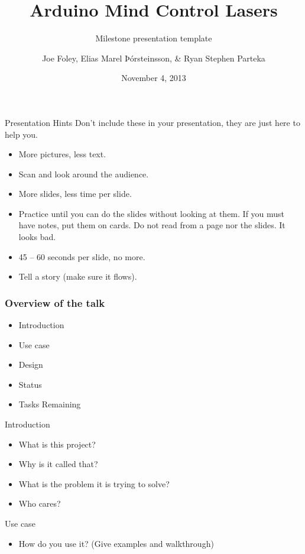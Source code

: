 \documentclass{beamer}
\title{Arduino Mind Control Lasers}
\subtitle{Milestone presentation template}
\author[J. Foley, E. Þorsteinsson, \& R. Parteka]{Joe Foley,
  Elias Marel Þórsteinsson, \& Ryan Stephen Parteka}
\institute[RU]{
  Department of Science and Engineering (TVD) \\
  Reykjavík University \\
}
\date{November 4, 2013} %
\begin{document}
\begin{frame}[plain]
  \titlepage
\end{frame}

\begin{frame}{Presentation Hints}
Don't include these in your presentation, they are just here to help you.
\begin{itemize}
\item More pictures, less text.
\item Scan and look around the audience.
\item More slides, less time per slide.
\item Practice until you can do the slides without looking at them.
  If you must have notes, put them on cards.  Do not read from a page
  nor the slides.  It looks bad.
\item 45 -- 60 seconds per slide, no more.
\item Tell a story (make sure it flows).
\end{itemize}
\end{frame}

\begin{frame}
\frametitle{Overview of the talk}
\begin{itemize}
\item Introduction
\item Use case
\item Design
\item Status
\item Tasks Remaining
\end{itemize}
\end{frame}

\begin{frame}{Introduction}
\begin{itemize}
\item What is this project?
\item Why is it called that?  
\item What is the problem it is trying to solve?
\item Who cares?
\end{itemize}
\end{frame}

\begin{frame}{Use case}
\begin{itemize}
\item How do you use it?  (Give examples and walkthrough)
\end{itemize}
\end{frame}
\end{document}
